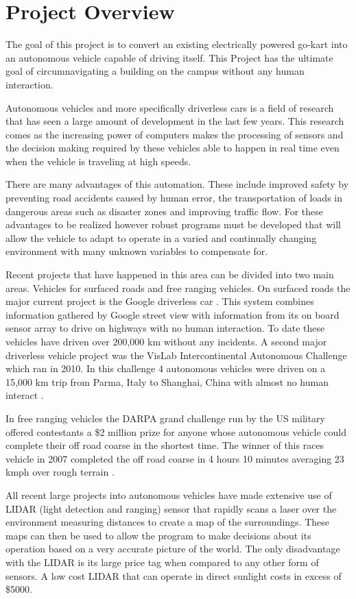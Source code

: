 \chapter{Project Overview}

The goal of this project is to convert an existing electrically powered go-kart into an autonomous vehicle capable of driving itself. This Project has the ultimate goal of circumnavigating a building on the campus without any human interaction.

Autonomous vehicles and more specifically driverless cars is a field of research that has seen a large amount of development in the last few years. This research comes as the increasing power of computers makes the processing of sensors and the decision making required by these vehicles able to happen in real time even when the vehicle is traveling at high speeds.

There are many advantages of this automation. These include improved safety by preventing road accidents caused by human error, the transportation of loads in dangerous areas such as disaster zones and improving traffic flow. For these advantages to be realized however robust programs must be developed that will allow the vehicle to adapt to operate in a varied and continually changing environment with many unknown variables to compensate for.

Recent projects that have happened in this area can be divided into two main areas. Vehicles for surfaced roads and free ranging vehicles. On surfaced roads the major current project is the Google driverless car \cite{google_car_blog}. This system combines information gathered by Google street view with information from its on board sensor array to drive on highways with no human interaction. To date these vehicles have driven over 200,000 km without any incidents. A second major driverless vehicle project was the VisLab Intercontinental Autonomous Challenge which ran in 2010. In this challenge 4 autonomous vehicles were driven on a 15,000 km trip from Parma, Italy to Shanghai, China with almost no human interact \cite{vislab}.

 In free ranging vehicles the DARPA grand challenge run by the US military offered contestants a \$2 million prize for anyone whose autonomous vehicle could complete their off road coarse in the shortest time. The winner of this races vehicle in 2007 completed the off road coarse in 4 hours 10 minutes averaging 23 kmph over rough terrain \cite{darpa}.

All recent large projects into autonomous vehicles have made extensive use of LIDAR (light detection and ranging) sensor that rapidly scans a laser over the environment measuring distances to create a map of the surroundings. These maps can then be used to allow the program to make decisions about its operation based on a very accurate picture of the world. The only disadvantage with the LIDAR is its large price tag when compared to any other form of sensors. A low cost LIDAR that can operate in direct sunlight costs in excess of \$5000. 


